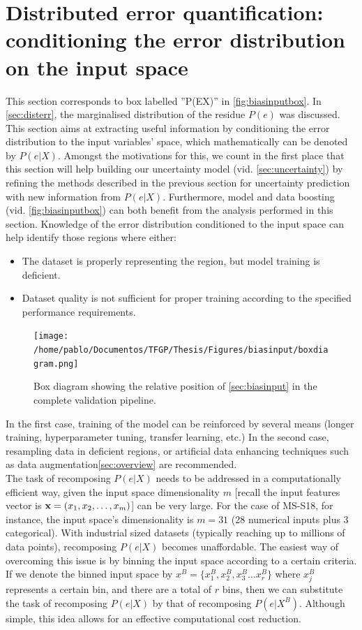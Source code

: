 \section{Distributed error quantification: conditioning the error distribution on the input space}\label{sec:biasinput}
This section corresponds to box labelled ''P(E\textbar{}X)'' in \autoref{fig:biasinputbox}. In \autoref{sec:disterr}, the marginalised distribution of the residue $P(e)$ was discussed. This section aims at extracting useful information by conditioning the error distribution to the input variables' space, which mathematically can be denoted by $P(e|X)$. Amongst the motivations for this, we count in the first place that this section will help building our uncertainty model (vid. \autoref{sec:uncertainty}) by refining the methods described in the previous section for uncertainty prediction with new information from $P(e|X)$. Furthermore, model and data boosting (vid. \autoref{fig:biasinputbox}) can both benefit from the analysis performed in this section. Knowledge of the error distribution conditioned to the input space can help identify those regions where either:
\begin{itemize}
	\item The dataset is properly representing the region, but model training is deficient.
	\item Dataset quality is not sufficient for proper training according to the specified performance requirements.
\end{itemize}
\begin{figure}[!htb]
	\centering
	\texttt{[image: /home/pablo/Documentos/TFGP/Thesis/Figures/biasinput/boxdiagram.png]}
	\caption{Box diagram showing the relative position of \autoref{sec:biasinput} in the complete validation pipeline.}
	\label{fig:biasinputbox} 
\end{figure}
\indent In the first case, training of the model can be reinforced by several means (longer training, hyperparameter tuning, transfer learning, etc.) In the second case, resampling data in deficient regions, or artificial data enhancing techniques such as data augmentation\autoref{sec:overview} are recommended.\\
%
\indent The task of recomposing $P(e|X)$ needs to be addressed in a computationally efficient way, given the input space dimensionality $m$ [recall the input features vector is ${\bf x}=(x_1,x_2,\dots,x_m)$] can be very large. For the case of MS-S18, for instance, the input space's dimensionality is $m=31$ (28 numerical inputs plus 3 categorical). With industrial sized datasets (typically reaching up to millions of data points), recomposing $P(e|X)$ becomes unaffordable. The easiest way of overcoming this issue is by binning the input space according to a certain criteria. If we denote the binned input space by $x^B=\{x^B_1,x^B_2,x^B_3\ldots x^B_r\}$ where $x^B_j$ represents a certain bin, and there are a total of $r$ bins, then we can substitute the task of recomposing $P(e|X)$ by that of recomposing $P(e|X^B)$. Although simple, this idea allows for an effective computational cost reduction.\\
%
